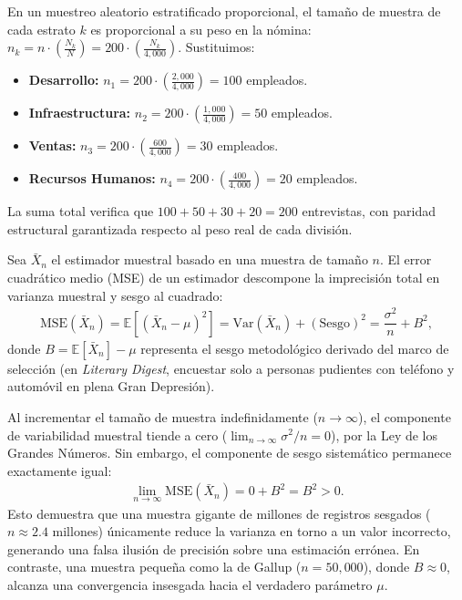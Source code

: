 \begin{solproblema}[prob:4bc23ad]
	En un muestreo aleatorio estratificado proporcional, el tamaño de muestra de cada estrato $k$ es proporcional a su peso en la nómina: $n_k = n \cdot \left(\frac{N_k}{N}\right) = 200 \cdot \left(\frac{N_k}{4,000}\right)$. Sustituimos:
	\begin{itemize}
		\item \textbf{Desarrollo:} $n_1 = 200 \cdot \left(\frac{2,000}{4,000}\right) = 100$ empleados.
		\item \textbf{Infraestructura:} $n_2 = 200 \cdot \left(\frac{1,000}{4,000}\right) = 50$ empleados.
		\item \textbf{Ventas:} $n_3 = 200 \cdot \left(\frac{600}{4,000}\right) = 30$ empleados.
		\item \textbf{Recursos Humanos:} $n_4 = 200 \cdot \left(\frac{400}{4,000}\right) = 20$ empleados.
	\end{itemize}
	La suma total verifica que $100 + 50 + 30 + 20 = 200$ entrevistas, con paridad estructural garantizada respecto al peso real de cada división.
\end{solproblema}

\begin{solproblema}
	Sea $\bar{X}_n$ el estimador muestral basado en una muestra de tamaño $n$. El error cuadrático medio (MSE) de un estimador descompone la imprecisión total en varianza muestral y sesgo al cuadrado:
	\begin{align}
		\text{MSE}(\bar{X}_n) = \mathbb{E}\left[(\bar{X}_n - \mu)^2\right] = \text{Var}(\bar{X}_n) + (\text{Sesgo})^2 = \dfrac{\sigma^2}{n} + B^2,
	\end{align}
	donde $B = \mathbb{E}[\bar{X}_n] - \mu$ representa el sesgo metodológico derivado del marco de selección (en \emph{Literary Digest}, encuestar solo a personas pudientes con teléfono y automóvil en plena Gran Depresión).

	Al incrementar el tamaño de muestra indefinidamente ($n \to \infty$), el componente de variabilidad muestral tiende a cero ($\lim_{n \to \infty} \sigma^2/n = 0$), por la Ley de los Grandes Números. Sin embargo, el componente de sesgo sistemático permanece exactamente igual:
	\begin{align}
		\lim_{n \to \infty} \text{MSE}(\bar{X}_n) = 0 + B^2 = B^2 > 0.
	\end{align}
	Esto demuestra que una muestra gigante de millones de registros sesgados ($n \approx 2.4$ millones) únicamente reduce la varianza en torno a un valor incorrecto, generando una falsa ilusión de precisión sobre una estimación errónea. En contraste, una muestra pequeña como la de Gallup ($n = 50,000$), donde $B \approx 0$, alcanza una convergencia insesgada hacia el verdadero parámetro $\mu$.
\end{solproblema}

